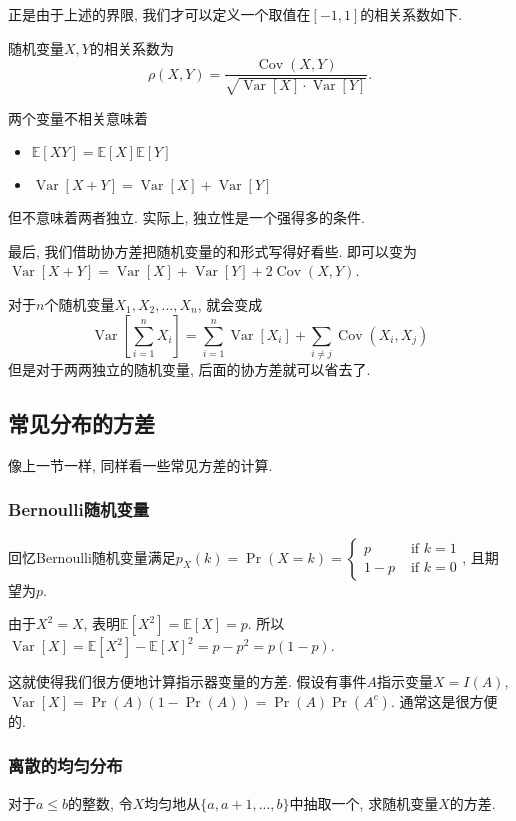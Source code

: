 \documentclass{ctexart}
\begin{document}
正是由于上述的界限, 我们才可以定义一个取值在$[-1,1]$的相关系数如下.
\begin{definition}[相关系数]
    随机变量$X, Y$的相关系数为$$\rho(X, Y)=\frac{\operatorname{Cov}(X, Y)}{\sqrt{\operatorname{Var}[X] \cdot \operatorname{Var}[Y]}}.$$
\end{definition}

两个变量不相关意味着
\begin{itemize}
    \item $\mathbb{E}[X Y]=\mathbb{E}[X] \mathbb{E}[Y]$
    \item $\operatorname{Var}[X+Y]=\operatorname{Var}[X]+\operatorname{Var}[Y]$
\end{itemize}
但不意味着两者独立. 实际上, 独立性是一个强得多的条件. 

最后, 我们借助协方差把随机变量的和形式写得好看些. 即可以变为$\operatorname{Var}[X+Y]=\operatorname{Var}[X]+\operatorname{Var}[Y]+2 \operatorname{Cov}(X, Y)$. 

对于$n$个随机变量$X_1, X_2, \ldots, X_n$, 就会变成
$$\operatorname{Var}\left[\sum_{i=1}^n X_i\right]=\sum_{i=1}^n \operatorname{Var}\left[X_i\right]+\sum_{i \neq j} \operatorname{Cov}\left(X_i, X_j\right)$$
但是对于两两独立的随机变量, 后面的协方差就可以省去了. 

\subsection{常见分布的方差} 像上一节一样, 同样看一些常见方差的计算. 

\subsubsection{Bernoulli随机变量} 回忆Bernoulli随机变量满足$p_X(k)=\operatorname{Pr}(X=k)= \begin{cases}p & \text { if } k=1 \\ 1-p & \text { if } k=0\end{cases}$, 且期望为$p$. 

由于$X^2=X$, 表明$\mathbb{E}\left[X^2\right]=\mathbb{E}[X]=p$. 所以$\operatorname{Var}[X]=\mathbb{E}\left[X^2\right]-\mathbb{E}[X]^2=p-p^2=p(1-p)$. 

这就使得我们很方便地计算指示器变量的方差. 假设有事件$A$指示变量$X=I(A)$, $\operatorname{Var}[X]=\operatorname{Pr}(A)(1-\operatorname{Pr}(A))=\operatorname{Pr}(A) \operatorname{Pr}\left(A^c\right)$. 通常这是很方便的. 

\subsubsection{离散的均匀分布} 对于$a\leq b$的整数, 令$X$均匀地从$\{ a, a+1, ..., b \}$中抽取一个, 求随机变量$X$的方差. 
\end{document}
